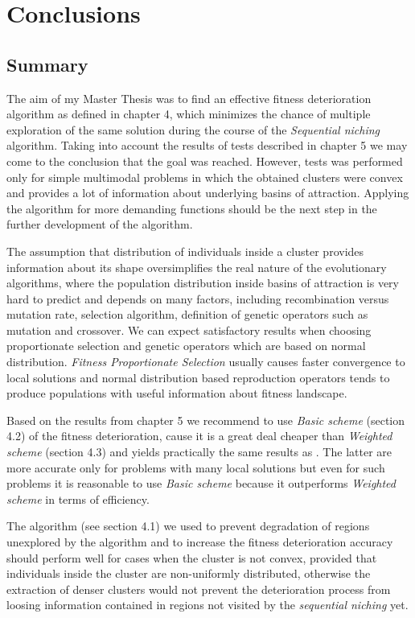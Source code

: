 
\chapter{Conclusions}
\label{Conclusions}

\section{Summary}
The aim of my Master Thesis was to find an effective fitness deterioration
algorithm as defined in chapter 4, which minimizes the chance of multiple
exploration of the same solution during the course of the \textit{Sequential
niching} algorithm. Taking into account the results of tests described in
chapter 5 we may come to the conclusion that the goal was reached. However,
tests was performed only for simple
multimodal problems in which the obtained clusters were convex and provides 
a lot of information about underlying basins of attraction. Applying the
algorithm for more demanding functions should be the next step in the further
development of the algorithm.  

The assumption that distribution of individuals inside a cluster provides
information about its shape oversimplifies the real nature of the evolutionary
algorithms, where the population distribution inside basins of attraction is 
very hard to predict and depends on many factors, including recombination versus
mutation rate, selection algorithm, definition of genetic operators such as
mutation and crossover. We can expect satisfactory results when
choosing proportionate selection and genetic operators which are based on normal
distribution. \textit{Fitness Proportionate Selection} usually causes faster
convergence to local solutions and normal distribution based reproduction operators tends 
to produce populations with useful information about fitness landscape.

Based on the results from chapter 5 we recommend to use \textit{Basic scheme}
(section 4.2) of the fitness deterioration, cause it is a great deal cheaper
than \textit{Weighted scheme} (section 4.3) and yields practically the
same results as . The latter are more
accurate only for problems with many local solutions but even for such problems it is reasonable to use \textit{Basic scheme}
because it outperforms \textit{Weighted scheme} in terms of efficiency. 

The algorithm (see section 4.1) we used to prevent degradation of regions
unexplored by the algorithm and to increase the fitness deterioration accuracy
should perform well for cases when the cluster is not convex, provided that
individuals inside the cluster are non-uniformly distributed,
otherwise the extraction of denser clusters would not prevent the deterioration
process from loosing information contained in regions not visited
by the \textit{sequential niching} yet.

